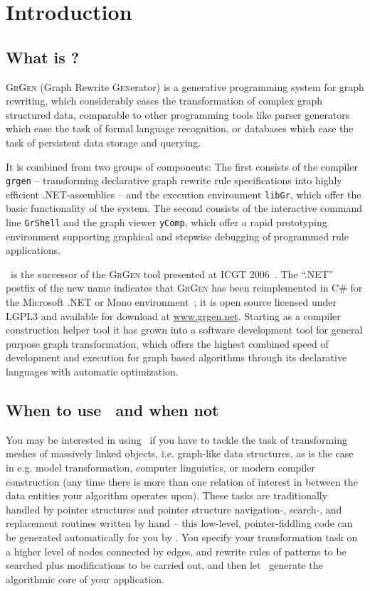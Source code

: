 \chapter{Introduction}
\label{chp:intro}


\section{What is \GrG?}

{\scshape GrGen} (\textsc{G}raph \textsc{R}ewrite \textsc{Gen}erator) is a generative programming system for graph rewriting,
which considerably eases the transformation of complex graph structured data,
comparable to other programming tools like parser generators which ease the task of formal language recognition,
or databases which ease the task of persistent data storage and querying. 

It is combined from two groups of components:
The first consists of the compiler \texttt{grgen} -- transforming declarative graph rewrite rule specifications into highly efficient .NET-assemblies --
and the execution environment \texttt{libGr}, which offer the basic functionality of the system. 
The second consists of the interactive command line \texttt{GrShell} and the graph viewer \texttt{yComp},
which offer a rapid prototyping environment supporting graphical and stepwise debugging of programmed rule applications.

\GrG~is the successor of the \textsc{GrGen} tool presented at ICGT 2006~\cite{GBGHS:06}. 
The ``.NET'' postfix of the new name indicates that \textsc{GrGen} has been reimplemented in C\# for the Microsoft .NET or Mono environment~\cite{NET,MONO};
it is open source licensed under LGPL3 and available for download at \url{www.grgen.net}.
Starting as a compiler construction helper tool it has grown into a software development tool for general purpose graph transformation,
which offers the highest combined speed of development and execution for graph based algorithms through its declarative languages with automatic optimization.


\section{When to use \GrG~and when not}
You may be interested in using \GrG\ if you have to tackle the task of transforming meshes of massively linked objects, i.e. graph-like data structures,
as is the case in e.g. model transformation, computer linguistics, or modern compiler construction 
(any time there is more than one relation of interest in between the data entities your algorithm operates upon).
These tasks are traditionally handled by pointer structures and pointer structure navigation-, search-, and replacement routines written by hand
-- this low-level, pointer-fiddling code can be generated automatically for you by \GrG.
You specify your transformation task on a higher level of nodes connected by edges, and rewrite rules of patterns to be searched plus modifications to be carried out,
and then let \GrG\ generate the algorithmic core of your application.

